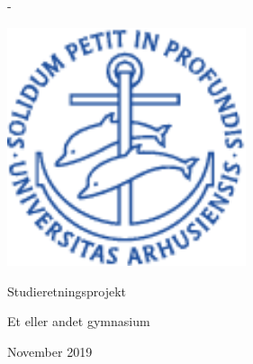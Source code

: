 
\begin{titlingpage}
  \newlength{\frontpagecorrection}
  \calccentering{\frontpagecorrection}
  \begin{adjustwidth*}{\frontpagecorrection-2cm}{-\frontpagecorrection-2cm}
    \centering

    \sffamily

    \fontsize{26pt}{29pt}\selectfont
    \projecttitle \par

    \vspace{0.8cm}

    \fontsize{18pt}{22pt}\selectfont
    \theauthor \par

    \strut\vfill

    \includegraphics[width=7cm]{front/segla1b}

    \strut\vfill

    Studieretningsprojekt

    \vspace{1.0cm}

    \fontsize{14pt}{17pt}\selectfont
    Et eller andet gymnasium\par

    \vspace{0.3cm}

    November 2019

  \end{adjustwidth*}
\end{titlingpage}


